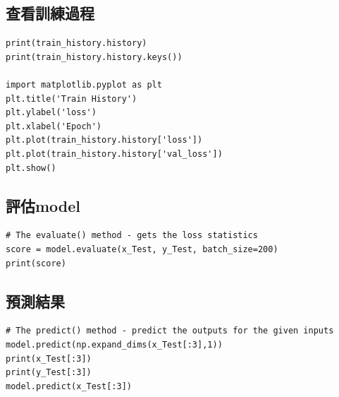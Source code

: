 \documentclass[a4paper,12pt]{article}
\begin{document}
\subsection{查看訓練過程}
\label{sec:orgfdcc124}
\lstset{breaklines=true,language=Python,label= ,caption= ,captionpos=b,numbers=none}
\begin{lstlisting}
print(train_history.history)
print(train_history.history.keys())

import matplotlib.pyplot as plt
plt.title('Train History')
plt.ylabel('loss')
plt.xlabel('Epoch')
plt.plot(train_history.history['loss'])
plt.plot(train_history.history['val_loss'])
plt.show()
\end{lstlisting}

\subsection{評估model}
\label{sec:orgc252e90}
\lstset{breaklines=true,language=Python,label= ,caption= ,captionpos=b,numbers=none}
\begin{lstlisting}
# The evaluate() method - gets the loss statistics
score = model.evaluate(x_Test, y_Test, batch_size=200)
print(score)
\end{lstlisting}

\subsection{預測結果}
\label{sec:org05e0d85}
\lstset{breaklines=true,language=Python,label= ,caption= ,captionpos=b,numbers=none}
\begin{lstlisting}
# The predict() method - predict the outputs for the given inputs
model.predict(np.expand_dims(x_Test[:3],1))
print(x_Test[:3])
print(y_Test[:3])
model.predict(x_Test[:3])
\end{lstlisting}
\end{document}
